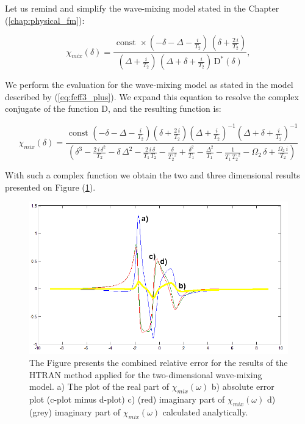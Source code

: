 \documentclass[12pt,twoside,a4paper]{article}
\numberwithin{equation}{subsection}
\numberwithin{figure}{subsection}
\begin{document}
Let us remind and simplify the wave-mixing model stated in the Chapter (\ref{chap:physical_fm}):

\begin{equation} \label{eq:htran_fm}
	\chi_{mix} (\delta) =
      \frac { \text{ const } \times ( - \delta - \Delta - \frac{i}{ { T_{2} } } ) \, ( \delta  + \frac{2 \, i} { { T_{2} } } ) }
            { ( \Delta + \frac {i}{ { T_{2} } } ) \, ( \Delta  + \delta  + \frac {i}{ { T_{2} } } ) \, { \mathrm{D} } ^ {*} (\delta) },
\end{equation}

We perform the evaluation for the wave-mixing model as stated in the model described by (\ref{eq:feff3_plus}). We expand this equation to resolve the complex conjugate of the function D, and the resulting function is:

\begin{equation} \label{eq:htran_feffexp}
  \chi_{mix}( \delta ) = 
    \frac{ \text{ const } 
           ( - \delta - \Delta - \frac {i}{ T_{2} } ) 
           ( \delta + \frac{2 \, i}{ T_{2} } ) 
	       ( \Delta + \frac {i}{ T_{2} } ) ^ {-1} 
	       ( \Delta + \delta + \frac {i}{ T_{2} } ) ^ {-1} } 
	     { ( \delta^{3} 
	       - \frac{2 \, i \, \delta^{2} } { T_{2} } 
	       - \delta \,\Delta^{2} 
	       - \frac {2\,i\,\delta } { T_{1}  \, T_{2} } 
	       - \frac{ \delta }{ {T_{2} } ^ {2} } 
	       + \frac { \delta^{2} } { T_{1} } 
	       - \frac { \Delta^{2} } { T_{1} } 
	       - \frac {1}{ { T_{1} } \, {T_{2}}^{2}} 
	       - {\Omega_{2}}\,\delta  
	       + \frac { \Omega_{2} \, i} { T_{2} } ) }
\end{equation}	     

With such a complex function we obtain the two and three dimensional results presented on Figure (\ref{fig:htran_mix_2d}).
 
\begin{figure}
  \includegraphics[width=150mm]{img/htran_fmix_2d.png}
  \caption{The Figure presents the combined relative error for the results of the HTRAN method applied for the two-dimensional wave-mixing model.
   a) The plot of the real part of ${\chi_{mix}}(\omega )$
   b) absolute error plot (c-plot minus d-plot)
   c) (red) imaginary part of  ${\chi_{mix}}(\omega )$
   d) (grey) imaginary part of ${\chi_{mix}}(\omega )$ calculated analytically.
   \label{fig:htran_mix_2d} }
\end{figure}
\end{document}
